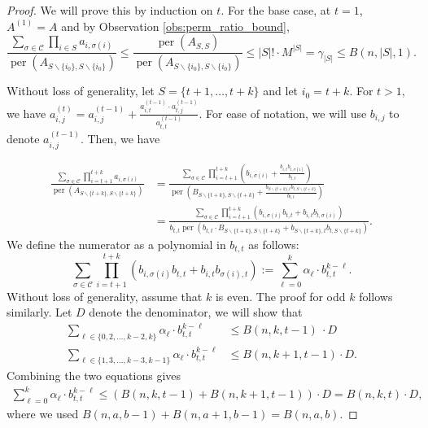 \documentclass[10pt,a4paper]{amsart}
\DeclareMathOperator{\per}{per}
\begin{document}
\begin{proof}
    We will prove this by induction on $t$. For the base case, at $t = 1$, $A^{(1)} = A$ and by Observation \ref{obs:perm_ratio_bound},
    \begin{equation*}
          \frac{\sum_{\sigma \in \mathcal{C}} \prod_{i \in S} a_{i, \sigma(i)}}{\per(A_{S\backslash \{i_0\}, S \backslash \{i_0\}})} \leq \frac{\per(A_{S, S})}{\per(A_{S\backslash \{i_0\}, S \backslash \{i_0\}})} \leq |S|! \cdot M^{|S|} = \gamma_{|S|}\leq B(n,|S|,1).
    \end{equation*}

Without loss of generality, let $S=\{t+1, \ldots, t+k\}$ and let $i_0 = t+k$. 
    For $t > 1$, we have $a^{(t)}_{i,j} = a^{(t-1)}_{i,j} + \frac{a^{(t-1)}_{i,t} \cdot a^{(t-1)}_{t,j}}{a^{(t-1)}_{t,t}}$. 
    For ease of notation, we will use $b_{i,j}$ to denote $a^{(t-1)}_{i,j}$.  Then, we have

    \begin{align*}
        \frac{\sum_{\sigma \in \mathcal{C}} \prod_{i = t+1}^{t+k} a_{i, \sigma(i)}}{\per(A_{S\backslash \{t+k\}, S \backslash \{t+k\}})} &=  \frac{\sum_{\sigma \in \mathcal{C}} \prod_{i = t+1}^{t+k} \left(b_{i, \sigma(i)} + \frac{b_{i,t} b_{t,\sigma(i)}}{b_{t,t}}\right)}{\per\left(B_{S\backslash \{t+k\}, S \backslash \{t+k\}} + \frac{b_{S\backslash \{t+k\}, t} b_{t, S\backslash \{t+k\}}}{b_{t,t}}\right)} \\
        &= \frac{\sum_{\sigma \in \mathcal{C}} \prod_{i = t+1}^{t+k} \left(b_{i, \sigma(i)} b_{t,t} + b_{i,t} b_{t,\sigma(i)}\right)}{b_{t,t} \per\left(b_{t,t} \cdot B_{S\backslash \{t+k\}, S \backslash \{t+k\}} +b_{S\backslash \{t+k\}, t} b_{t, S\backslash \{t+k\}}\right)}.
    \end{align*}
    We define the numerator as a polynomial in $b_{t,t}$ as follows:
    \begin{equation*}
        \sum_{\sigma \in \mathcal{C}} \prod_{i = t+1}^{t+k} \left(b_{i, \sigma(i)} b_{t,t} + b_{i,t} b_{\sigma(i), t}\right) := \sum_{\ell = 0}^{k} \alpha_{\ell} \cdot b_{t,t}^{k-\ell}.
    \end{equation*}
    Without loss of generality, assume that $k$ is even. The proof for odd $k$ follows similarly. Let $D$ denote the denominator, we will show that 
    \begin{align*}
        \sum_{\ell \in \{0, 2, \ldots, k-2, k\}} \alpha_{\ell} \cdot b_{t,t}^{k-\ell} &\leq B(n, k, t-1) \ \cdot D \\
        \sum_{\ell \in \{1, 3, \ldots, k-3, k-1\} } \alpha_{\ell} \cdot b_{t,t}^{k-\ell} &\leq B(n, k+1, t-1) \cdot D.
    \end{align*}
    Combining the two equations gives
    \begin{align*}
        \sum_{\ell = 0}^{k} \alpha_{\ell} \cdot b_{t,t}^{k-\ell} \leq \left( B(n, k, t-1) + B(n, k+1, t-1)\right) \cdot D = B(n, k, t)  \cdot D,
    \end{align*}
where we used $B(n, a, b-1) + B(n, a+1, b-1) = B(n, a, b)$.


\end{proof}
\end{document}
